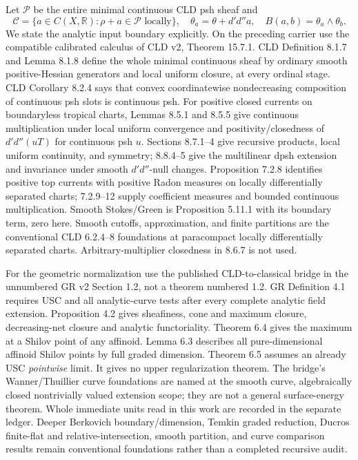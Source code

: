 \documentclass[11pt]{article}
\newcommand{\DD}{d'd''}
\newcommand{\C}{\mathcal C}
\newcommand{\R}{\mathbb R}
\begin{document}
Let $\mathscr P$ be the entire minimal continuous CLD psh sheaf and
\[
 \C=\{a\in C(X,\R):\rho+a\in\mathscr P\text{ locally}\},\quad
 \theta_a=\theta+\DD a,\quad B(a,b)=\theta_a\wedge\theta_b.
\]
We state the analytic input boundary explicitly. On the preceding
carrier use the compatible calibrated calculus of CLD v2, Theorem
15.7.1. CLD Definition 8.1.7 and Lemma 8.1.8 define the whole minimal
continuous sheaf by ordinary smooth positive-Hessian generators and
local uniform closure, at every ordinal stage. CLD Corollary 8.2.4
says that convex coordinatewise nondecreasing composition of continuous
psh slots is continuous psh. For positive closed currents on boundaryless
tropical charts, Lemmas 8.5.1 and 8.5.5 give continuous multiplication
under local uniform convergence and positivity/closedness of $\DD(uT)$
for continuous psh $u$. Sections 8.7.1--4 give recursive products,
local uniform continuity, and symmetry; 8.8.4--5 give the multilinear
dpsh extension and invariance under smooth $\DD$-null changes.
Proposition 7.2.8 identifies positive top currents with positive Radon
measures on locally differentially separated charts; 7.2.9--12 supply
coefficient measures and bounded continuous multiplication. Smooth
Stokes/Green is Proposition 5.11.1 with its boundary term, zero here.
Smooth cutoffs, approximation, and finite partitions are the conventional
CLD 6.2.4--8 foundations at paracompact locally differentially separated
charts. Arbitrary-multiplier closedness in 8.6.7 is not used.

For the geometric normalization use the published CLD-to-classical
bridge in the unnumbered GR v2 Section 1.2, not a theorem numbered 1.2.
GR Definition 4.1 requires USC and all analytic-curve tests after every
complete analytic field extension. Proposition 4.2 gives sheafiness,
cone and maximum closure, decreasing-net closure and analytic
functoriality. Theorem 6.4 gives the maximum at a Shilov point of any
affinoid. Lemma 6.3 describes all pure-dimensional affinoid Shilov
points by full graded dimension. Theorem 6.5 assumes an already USC
\emph{pointwise} limit. It gives no upper regularization theorem.
The bridge's Wanner/Thuillier curve foundations are named at the
smooth curve, algebraically closed nontrivially valued extension scope;
they are not a general surface-energy theorem. Whole immediate units
read in this work are recorded in the separate ledger. Deeper Berkovich
boundary/dimension, Temkin graded reduction, Ducros finite-flat and
relative-intersection, smooth partition, and curve comparison results
remain conventional foundations rather than a completed recursive audit.
\end{document}
